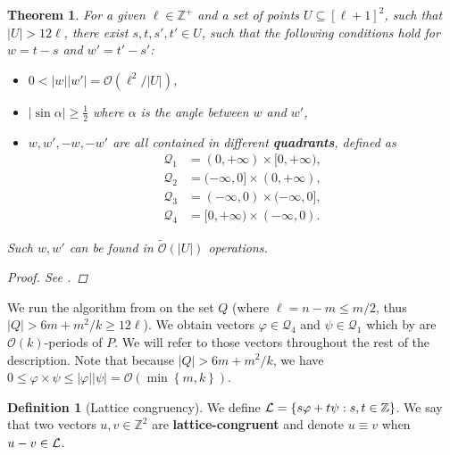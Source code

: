\documentclass[11pt]{article}
\newcommand{\Z}{\mathbb{Z}}
\renewcommand{\O}{\mathcal{O}}
\newcommand{\tO}{\tilde{\mathcal{O}}}
\renewcommand{\phi}{\varphi}
\newcommand{\set}[1]{\left\lbrace #1 \right\rbrace}
\newcommand{\eq}[1]{\begin{align*} #1 \end{align*}}
\theoremstyle{plain}
\newtheorem{theorem}{Theorem}
\theoremstyle{definition}
\newtheorem{definition}{Definition}
\theoremstyle{remark}
\begin{document}
\newcommand{\Q}{\mathcal{Q}}
\begin{theorem} \label{get_periods}
	For a given $\ell \in \Z^+$ and a set of points $U \subseteq [\ell + 1]^2$, such that $|U| > 12\ell$, there exist $s, t, s', t' \in U$, such that the following conditions hold for $w = t - s$ and $w' = t' - s'$:
	\begin{itemize}
		\item $0 < |w||w'| = \O(\ell^2 / |U|)$,
		\item $|\sin \alpha| \ge \frac{1}{2}$ where $\alpha$ is the angle between $w$ and $w'$,
		\item $w, w', -w, -w'$ are all contained in different \textbf{quadrants}, defined as
			\eq{
				\Q_1 &= (0, +\infty) \times [0, +\infty), \\
				\Q_2 &= (-\infty, 0] \times (0, +\infty), \\
				\Q_3 &= (-\infty, 0) \times (-\infty, 0], \\
				\Q_4 &= [0, +\infty) \times (-\infty, 0).
			}
	\end{itemize}
	Such $w, w'$ can be found in $\tO(|U|)$ operations.
	\begin{proof} See . \end{proof}
\end{theorem}


We run the algorithm from  on the set $Q$ (where $\ell = n - m \le m / 2$, thus $|Q| > 6m + m^2/k \ge 12\ell$).
We obtain vectors $\phi \in \Q_4$ and $\psi \in \Q_1$ which by  are $\O(k)$-periods of $P$.
We will refer to those vectors throughout the rest of the description.
Note that because $|Q| > 6m + m^2 / k$, we have $0 \le \phi \times \psi \le |\phi||\psi| = \O(\min\set{m, k})$.


\begin{definition}[Lattice congruency]\label{lattice_congruency}
	We define $\L = \set{s\phi + t\psi : s, t \in \Z}$.
	We say that two vectors $u, v \in \Z^2$ are \textbf{lattice-congruent} and denote $u \equiv v$ when $u - v \in \mathcal{L}$.
\end{definition}
\end{document}
